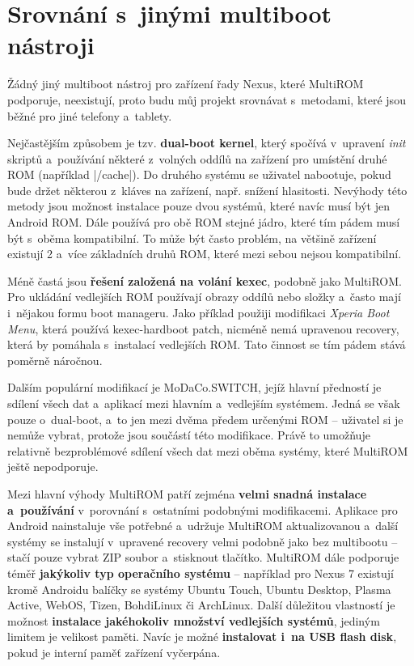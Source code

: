 \documentclass[12pt, a4paper, oneside]{article}
\newcommand{\B}{\textbf} %
\newcommand{\It}{\textit}  %
\begin{document}
\linespread{1.3}

\section{Srovnání s~jinými multiboot nástroji}
Žádný jiný multiboot nástroj pro zařízení řady Nexus, které MultiROM podporuje, neexistují, proto budu můj projekt srovnávat s~metodami, které jsou běžné pro jiné telefony a~tablety.

Nejčastějším způsobem je tzv. \B{dual-boot kernel}, který spočívá v~upravení \It{init} skriptů a~používání některé z~volných oddílů na zařízení pro umístění druhé ROM (například |/cache|). Do druhého systému se uživatel nabootuje, pokud bude držet některou z~kláves na zařízení, např. snížení hlasitosti. Nevýhody této metody jsou možnost instalace pouze dvou systémů, které navíc musí být jen Android ROM. Dále používá pro obě ROM stejné jádro, které tím pádem musí být s~oběma kompatibilní. To může být často problém, na většině zařízení existují 2 a~více základních druhů ROM, které mezi sebou nejsou kompatibilní.

Méně častá jsou \B{řešení založená na volání kexec}, podobně jako MultiROM. Pro ukládání vedlejších ROM používají obrazy oddílů nebo složky a~často mají i~nějakou formu boot manageru. Jako příklad použiji modifikaci \It{Xperia Boot Menu}\cite{xperia-boot-menu}, která používá kexec-hardboot patch, nicméně nemá upravenou recovery, která by pomáhala s~instalací vedlejších ROM. Tato činnost se tím pádem stává poměrně náročnou.

Dalším populární modifikací je MoDaCo.SWITCH\cite{modaco-switch}, jejíž hlavní předností je sdílení všech dat a~aplikací mezi hlavním a~vedlejším systémem. Jedná se však pouze o~dual-boot, a~to jen mezi dvěma předem určenými ROM -- uživatel si je nemůže vybrat, protože jsou součástí této modifikace. Právě to umožňuje relativně bezproblémové sdílení všech dat mezi oběma systémy, které MultiROM ještě nepodporuje.

Mezi hlavní výhody MultiROM patří zejména \B{velmi snadná instalace a~používání} v~porovnání s~ostatními podobnými modifikacemi. Aplikace pro Android nainstaluje vše potřebné a~udržuje MultiROM aktualizovanou a~další systémy se instalují v~upravené recovery velmi podobně jako bez multibootu -- stačí pouze vybrat ZIP soubor a~stisknout tlačítko. MultiROM dále podporuje téměř \B{jakýkoliv typ operačního systému} -- například pro Nexus 7 existují kromě Androidu balíčky se systémy Ubuntu Touch, Ubuntu Desktop, Plasma Active, WebOS, Tizen, BohdiLinux či ArchLinux. Další důležitou vlastností je možnost \B{instalace jakéhokoliv množství vedlejších systémů}, jediným limitem je velikost paměti. Navíc je možné \B{instalovat i~na USB flash disk}, pokud je interní paměť zařízení vyčerpána.
\end{document}
